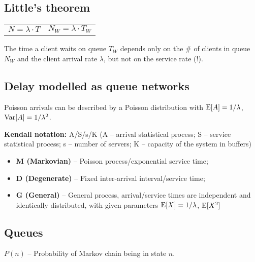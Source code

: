 \documentclass{form}
\begin{document}
\noindent
\begin{minipage}[c]{0.39\textwidth}
    \begin{minipage}{35mm} \subsection*{Little's theorem} \end{minipage}
    \begin{minipage}{40mm}
        \begin{tabular}{@{}c c@{}}
            $N = \lambda \cdot T$ &
            $N_W = \lambda \cdot T_W$
        \end{tabular}
    \end{minipage}

    The time a client waits on queue $T_W$ depends only on the \# of clients in queue $N_W$ and the client arrival rate $\lambda$, but not on the service rate (!).

    \subsection*{Delay modelled as queue networks}

    Poisson arrivals can be described by a Poisson distribution with $\operatorname{E}[A]=1/\lambda$, $\operatorname{Var}[A]=1/\lambda^2$.
\end{minipage}
\begin{minipage}[c]{0.60\textwidth}
    \noindent
    \textbf{Kendall notation:} A/S/s/K (A -- arrival statistical process; S -- service statistical process; s -- number of servers; K -- capacity of the system in buffers)

    \noindent
    \begin{itemize}
        \setlength\itemsep{0em}
        \item \textbf{M (Markovian)} -- Poisson process/exponential service time;
        \item \textbf{D (Degenerate)} -- Fixed inter-arrival interval/service time;
        \item \textbf{G (General)} -- General process, arrival/service times are independent and identically distributed, with given parameters $\operatorname{E}[X]=1/\lambda$, $\operatorname{E}[X^2]$
    \end{itemize}
\end{minipage}%

\pagebreak

\noindent
\begin{minipage}{0.1\textwidth}
    \subsection*{Queues}
\end{minipage}%
\begin{minipage}{0.9\textwidth}
    $P(n)$ -- Probability of Markov chain being in state $n$.
\end{minipage}
\end{document}
